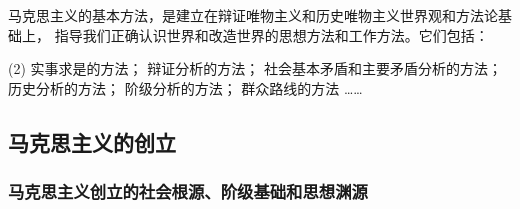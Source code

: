 \documentclass[11pt, UTF8]{book} %
\begin{document}
马克思主义的基本方法，是建立在辩证唯物主义和历史唯物主义世界观和方法论基础上，
指导我们正确认识世界和改造世界的思想方法和工作方法。它们包括：
\begin{tasks}(2)
    \task 实事求是的方法；
    \task 辩证分析的方法；
    \task 社会基本矛盾和主要矛盾分析的方法；
    \task 历史分析的方法；
    \task 阶级分析的方法；
    \task 群众路线的方法
    \task ……
\end{tasks}

\subsection{马克思主义的创立}



\subsubsection{马克思主义创立的社会根源、阶级基础和思想渊源}
\end{document}
